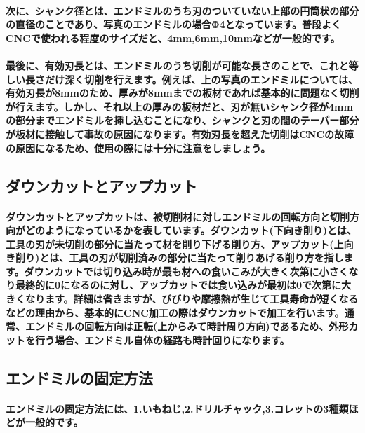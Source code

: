 \documentclass[b5paper, 9pt, twocolumn, titlepage,openany]{jsbook}%
\begin{document}
\paragraph{次に、シャンク径とは、エンドミルのうち刃のついていない上部の円筒状の部分の直径のことであり、写真のエンドミルの場合Φ4となっています。普段よくCNCで使われる程度のサイズだと、4mm,6mm,10mmなどが一般的です。}
\paragraph{最後に、有効刃長とは、エンドミルのうち切削が可能な長さのことで、これと等しい長さだけ深く切削を行えます。例えば、上の写真のエンドミルについては、有効刃長が8mmのため、厚みが8mmまでの板材であれば基本的に問題なく切削が行えます。しかし、それ以上の厚みの板材だと、刃が無いシャンク径が4mmの部分までエンドミルを挿し込むことになり、シャンクと刃の間のテーパー部分が板材に接触して事故の原因になります。有効刃長を超えた切削はCNCの故障の原因になるため、使用の際には十分に注意をしましょう。}

\subsection{ダウンカットとアップカット}

\paragraph{ダウンカットとアップカットは、被切削材に対しエンドミルの回転方向と切削方向がどのようになっているかを表しています。ダウンカット(下向き削り)とは、工具の刃が未切削の部分に当たって材を削り下げる削り方、アップカット(上向き削り)とは、工具の刃が切削済みの部分に当たって削りあげる削り方を指します。ダウンカットでは切り込み時が最も材への食いこみが大きく次第に小さくなり最終的に0になるのに対し、アップカットでは食い込みが最初は0で次第に大きくなります。詳細は省きますが、びびりや摩擦熱が生じて工具寿命が短くなるなどの理由から、基本的にCNC加工の際はダウンカットで加工を行います。通常、エンドミルの回転方向は正転(上からみて時計周り方向)であるため、外形カットを行う場合、エンドミル自体の経路も時計回りになります。}


\subsection{エンドミルの固定方法}

\paragraph{エンドミルの固定方法には、1.いもねじ,2.ドリルチャック,3.コレットの3種類ほどが一般的です。}
\end{document}
